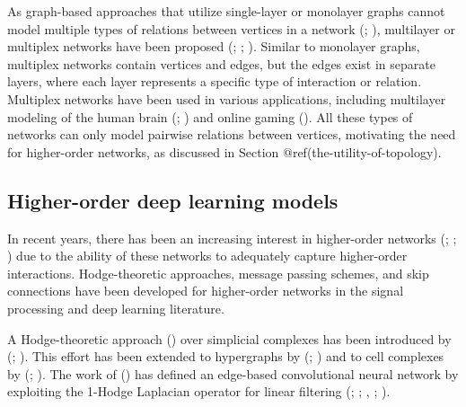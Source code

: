 \documentclass[
  12pt,
]{krantz}
\begin{document}
As graph-based approaches that utilize single-layer or monolayer graphs
cannot model multiple types of relations between vertices in a network
(;
), multilayer
or multiplex networks have been proposed
(;
;
). Similar to
monolayer graphs, multiplex networks contain vertices and edges, but the
edges exist in separate layers, where each layer represents a specific
type of interaction or relation. Multiplex networks have been used in
various applications, including multilayer modeling of the human brain
(;
) and online gaming
(). All these types of
networks can only model pairwise relations between vertices, motivating
the need for higher-order networks, as discussed in Section
@ref(the-utility-of-topology).

\subsection{Higher-order deep learning
models}\label{higher-order-deep-learning-models}

In recent years, there has been an increasing interest in higher-order
networks (;
;
) due to the ability of
these networks to adequately capture higher-order interactions.
Hodge-theoretic approaches, message passing schemes, and skip
connections have been developed for higher-order networks in the signal
processing and deep learning literature.

A Hodge-theoretic approach () over
simplicial complexes has been introduced by
(; ). This
effort has been extended to hypergraphs by
(; ) and to cell
complexes by (;
). The work of () has defined an edge-based
convolutional neural network by exploiting the 1-Hodge Laplacian
operator for linear filtering
(; ;
, ;
).
\end{document}
